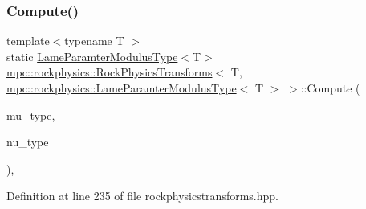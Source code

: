 \subsubsection{\texorpdfstring{Compute()}{Compute()}\hspace{0.1cm}{\footnotesize\ttfamily [4/7]}}
{\footnotesize\ttfamily template$<$typename T $>$ \\
static \mbox{\hyperlink{structmpc_1_1rockphysics_1_1_lame_paramter_modulus_type}{Lame\+Paramter\+Modulus\+Type}}$<$T$>$ \mbox{\hyperlink{structmpc_1_1rockphysics_1_1_rock_physics_transforms}{mpc\+::rockphysics\+::\+Rock\+Physics\+Transforms}}$<$ T, \mbox{\hyperlink{structmpc_1_1rockphysics_1_1_lame_paramter_modulus_type}{mpc\+::rockphysics\+::\+Lame\+Paramter\+Modulus\+Type}}$<$ T $>$ $>$\+::Compute (\begin{DoxyParamCaption}\item[{const \mbox{\hyperlink{structmpc_1_1rockphysics_1_1_shear_modulus_type}{mpc\+::rockphysics\+::\+Shear\+Modulus\+Type}}$<$ T $>$ \&}]{mu\+\_\+type,  }\item[{const \mbox{\hyperlink{structmpc_1_1rockphysics_1_1_poissons_ratio_type}{mpc\+::rockphysics\+::\+Poissons\+Ratio\+Type}}$<$ T $>$ \&}]{nu\+\_\+type }\end{DoxyParamCaption})\hspace{0.3cm}{\ttfamily [inline]}, {\ttfamily [static]}}



Definition at line 235 of file rockphysicstransforms.\+hpp.

\mbox{\label{structmpc_1_1rockphysics_1_1_rock_physics_transforms_3_01_t_00_01mpc_1_1rockphysics_1_1_lame_para5e1496021e3962f82419b3f52eb8942_a8a33b7636abc317e5ff1d91dcbed6797}} 
